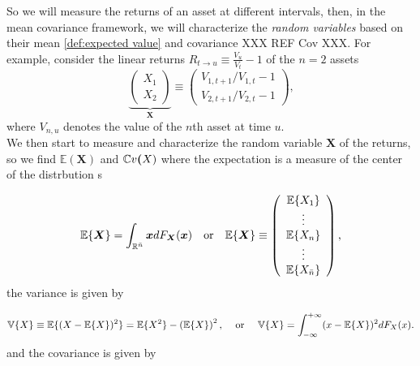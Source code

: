 \documentclass[../main.tex]{subfiles}
\begin{document}
So we will measure the returns of 
an asset at different intervals, then, in 
the mean covariance framework, we will characterize 
the \textit{random variables} based on their mean \ref{def:expected value} and covariance XXX REF Cov XXX.
For example, consider the linear returns $
    R_{t\rightarrow u}\equiv\frac{V_{u}}{V_{t}}-1\text{}$ of the $n=2$ assets
\begin{equation}
    \underbrace{\left( \begin{smallmatrix}
    X_{1}\\
    X_{2}
    \end{smallmatrix} \right) }_{\boldsymbol{X}}\equiv\left( \begin{smallmatrix}
    V_{1,t+1}/V_{1,t}-1\\
    V_{2,t+1}/V_{2,t}-1
    \end{smallmatrix} \right) \text{,}
    \end{equation}
where $V_{n,u}$ denotes the value of the $n$th asset at time $u$. \\
\indent We then start to measure and characterize the random variable $\textbf{X}$ of the returns, so we
find $\mathbb{E}(\textbf{X})$ and $\mathbb{C}v{\textbf(X)}$ where the expectation is a measure of the center
of the distrbution s

\[
    \mathbb{E}\{\boldsymbol{X}\}=\int_{\mathbb{R}^{\bar{n}}}\boldsymbol{x}dF_{\boldsymbol{X}}(\boldsymbol{x}) \quad \textnormal{or} \quad 
        \mathbb{E}\{\boldsymbol{X}\}\equiv\left( \begin{array}
        [c]{c}\mathbb{E}\{X_{1}\}\\
        \vdots\\
        \mathbb{E}\{X_{n}\}\\
        \vdots\\
        \mathbb{E}\{X_{\bar{n}}\}
        \end{array} \right) \text{,}
\]
the variance is given by 

\[
    \mathbb{V}\{X\}\equiv\mathbb{E}\{(X-\mathbb{E}\{X\})^{2}\}=\mathbb{E}\{X^{2}\}-\left( \mathbb{E}\{X\}\right) ^{2}\text{,}
    \quad \textnormal{ or } \quad 
    \mathbb{V}\{X\}=\int\nolimits_{-\infty}^{+\infty}(x-\mathbb{E}\{X\})^{2}dF_{X}(x)\text{.}
\]
and the covariance is given by
\end{document}
